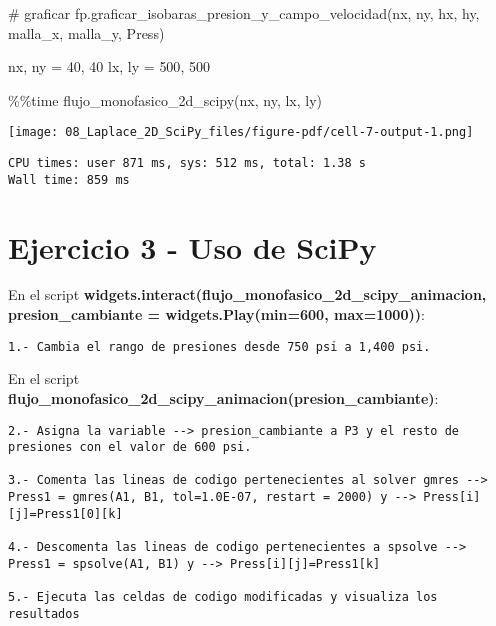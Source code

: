 \documentclass[
  letterpaper,
  DIV=11,
  numbers=noendperiod]{scrreprt}
\newenvironment{Shaded}{\begin{snugshade}}{\end{snugshade}}
\newcommand{\CommentTok}[1]{\textcolor[rgb]{0.37,0.37,0.37}{#1}}
\newcommand{\DecValTok}[1]{\textcolor[rgb]{0.68,0.00,0.00}{#1}}
\newcommand{\NormalTok}[1]{\textcolor[rgb]{0.00,0.23,0.31}{#1}}
\newcommand{\OperatorTok}[1]{\textcolor[rgb]{0.37,0.37,0.37}{#1}}
\begin{document}
\begin{Shaded}
\begin{Highlighting}[]
    \CommentTok{\# graficar}
\NormalTok{    fp.graficar\_isobaras\_presion\_y\_campo\_velocidad(nx, ny, hx, hy, malla\_x, malla\_y, Press)}
\end{Highlighting}
\end{Shaded}

\begin{Shaded}
\begin{Highlighting}[]
\NormalTok{nx, ny }\OperatorTok{=} \DecValTok{40}\NormalTok{, }\DecValTok{40}
\NormalTok{lx, ly }\OperatorTok{=} \DecValTok{500}\NormalTok{, }\DecValTok{500}
\end{Highlighting}
\end{Shaded}

\begin{Shaded}
\begin{Highlighting}[]
\OperatorTok{\%\%}\NormalTok{time}
\NormalTok{flujo\_monofasico\_2d\_scipy(nx, ny, lx, ly)}
\end{Highlighting}
\end{Shaded}

\texttt{[image: 08\_Laplace\_2D\_SciPy\_files/figure-pdf/cell-7-output-1.png]}

\begin{verbatim}
CPU times: user 871 ms, sys: 512 ms, total: 1.38 s
Wall time: 859 ms
\end{verbatim}

\section{Ejercicio 3 - Uso de SciPy}\label{ejercicio-3---uso-de-scipy}

En el script
\textbf{widgets.interact(flujo\_monofasico\_2d\_scipy\_animacion,
presion\_cambiante = widgets.Play(min=600, max=1000))}:

\begin{verbatim}
1.- Cambia el rango de presiones desde 750 psi a 1,400 psi.
\end{verbatim}

En el script
\textbf{flujo\_monofasico\_2d\_scipy\_animacion(presion\_cambiante)}:

\begin{verbatim}
2.- Asigna la variable --> presion_cambiante a P3 y el resto de presiones con el valor de 600 psi.

3.- Comenta las lineas de codigo pertenecientes al solver gmres --> Press1 = gmres(A1, B1, tol=1.0E-07, restart = 2000) y --> Press[i][j]=Press1[0][k]

4.- Descomenta las lineas de codigo pertenecientes a spsolve --> Press1 = spsolve(A1, B1) y --> Press[i][j]=Press1[k]

5.- Ejecuta las celdas de codigo modificadas y visualiza los resultados
\end{verbatim}
\end{document}
